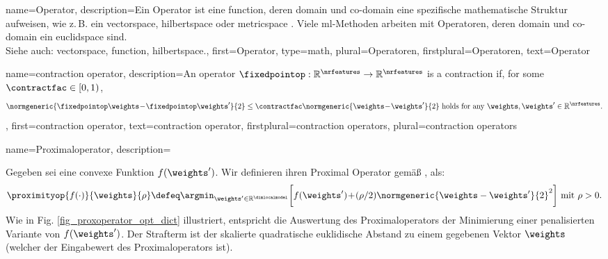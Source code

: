 {{{{{ 
{
    name={Operator}, 
    description={Ein Operator ist eine \gls{function}, 
        deren \gls{domain} und \gls{co-domain} eine spezifische mathematische Struktur aufweisen, 
        wie z. B. ein \gls{vectorspace}, \gls{hilbertspace} oder \gls{metricspace} \cite{Bauschke:2017,DunfordSchwartz1988}. 
        Viele \gls{ml}-Methoden arbeiten mit Operatoren, deren \gls{domain} und \gls{co-domain} 
        ein \gls{euclidspace} sind.
        \\
        Siehe auch: \gls{vectorspace}, \gls{function}, \gls{hilbertspace}.},
    first={Operator},
    type=math, 
    plural={Operatoren},
    firstplural={Operatoren},
    text={Operator}
}


{name={contraction operator},
	description={An operator $\fixedpointop: \mathbb{R}^{\nrfeatures} \rightarrow \mathbb{R}^{\nrfeatures}$
		is a contraction if, for some $\contractfac \in [0,1)$,
		\begin{equation} 
			\nonumber
			\normgeneric{ \fixedpointop \weights\!-\!\fixedpointop \weights'}{2}  \leq  \contractfac	\normgeneric{\weights\!-\!\weights'}{2} \mbox{ holds for any } \weights,\weights' \in \mathbb{R}^{\nrfeatures}.
		\end{equation}
	},
	first={contraction operator},
	text={contraction operator}, 
	firstplural={contraction operators}, 
	plural={contraction operators}
}


{name={Proximaloperator},
	description={Gegeben sei  eine \gls{convex}e Funktion $f(\weights')$. Wir definieren ihren Proximal Operator gemäß \cite{ProximalMethods}, \cite{Bauschke:2017} als: 
		$$\proximityop{f(\cdot)}{\weights}{\rho}\defeq \argmin_{\weights' \in \mathbb{R}^{\dimlocalmodel}} \bigg[ f(\weights')\!+\!(\rho/2) \normgeneric{\weights- \weights'}{2}^{2}\bigg] \mbox{ mit } \rho > 0. $$ 
		Wie in Fig. \ref{fig_proxoperator_opt_dict}  illustriert, entspricht die Auswertung des Proximaloperators der Minimierung einer penalisierten Variante von $f(\weights')$. Der Strafterm ist der skalierte quadratische euklidische Abstand zu einem gegebenen Vektor $\weights$ (welcher der Eingabewert des Proximaloperators ist).
	
}}}}}}}

